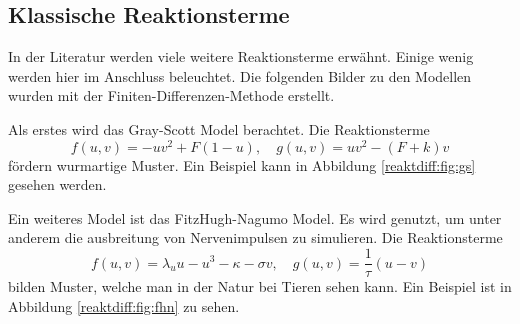 


\subsection{Klassische Reaktionsterme}
In der Literatur werden viele weitere Reaktionsterme erwähnt.
Einige wenig werden hier im Anschluss beleuchtet.
Die folgenden Bilder zu den Modellen wurden mit der Finiten-Differenzen-Methode erstellt.

Als erstes wird das Gray-Scott Model berachtet.
Die Reaktionsterme
\begin{equation}
     f(u,v) = -uv^2 + F(1 - u), \quad g(u,v) = uv^2 - (F + k)v
     \label{reaktdiff:equ:gs}
\end{equation}
fördern wurmartige Muster.
Ein Beispiel kann in Abbildung \ref{reaktdiff:fig:gs} gesehen werden.


Ein weiteres Model ist das FitzHugh-Nagumo Model.
Es wird genutzt, um unter anderem die ausbreitung von Nervenimpulsen zu simulieren.
Die Reaktionsterme
\begin{equation}
    f(u,v) = \lambda_u u - u^3 - \kappa - \sigma v, \quad g(u,v) = \frac{1}{\tau}(u - v)
    \label{reaktdiff:equ:fhn}
\end{equation}
bilden Muster, welche man in der Natur bei Tieren sehen kann.
Ein Beispiel ist in Abbildung \ref{reaktdiff:fig:fhn} zu sehen.

